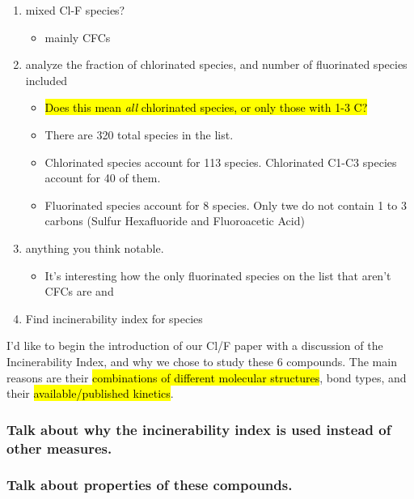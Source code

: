 \documentclass{article}
\begin{document}
\begin{enumerate}
\begin{table}
\begin{tabular}
        \end{tabular}
    \end{table}
    \item mixed Cl-F species?
    \begin{itemize}
        \item mainly CFCs
    \end{itemize}
    \item analyze the fraction of chlorinated species, and number of fluorinated species included
    \begin{itemize}
        \item \hl{Does this mean \emph{all} chlorinated species, or only those with 1-3 C?}
        \item There are 320 total species in the list. 
        \item Chlorinated species account for 113 species. Chlorinated C1-C3 species account for 40 of them.
        \item Fluorinated species account for 8 species. Only twe do not contain 1 to 3 carbons (Sulfur Hexafluoride and Fluoroacetic Acid)
    \end{itemize}
    \item anything you think notable.
    \begin{itemize}
        \item It's interesting how the only fluorinated species on the list that aren't CFCs are  and 
    \end{itemize}
    \item Find incinerability index for species %
\end{enumerate}
 
I’d like to begin the introduction of our Cl/F paper with a discussion of the Incinerability Index, and why we chose to study these 6 compounds. The main reasons are their \hl{combinations of different molecular structures}, bond types, and their \hl{available/published kinetics}. %

\subsubsection*{Talk about why the incinerability index is used instead of other measures.}

\subsubsection*{Talk about properties of these compounds.} 
\end{document}
